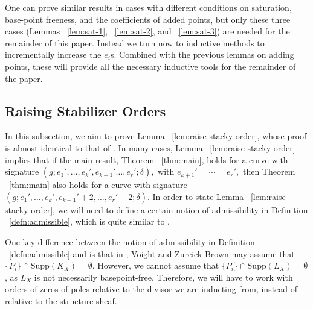 \documentclass{amsart}
\theoremstyle{plain}
\theoremstyle{definition}
\theoremstyle{remark}
\numberwithin{equation}{section}
\newcommand\ssec{\subsection}
\newcommand \Supp{\text{Supp}}
\newcommand \initial{\text{in}}
\begin{document}
%

One can prove similar results in cases with different conditions on saturation, base-point freeness, and the coefficients of added points, but only these three cases (Lemmas ~\ref{lem:sat-1}, ~\ref{lem:sat-2}, and ~\ref{lem:sat-3}) are needed for the remainder of this paper.  Instead we turn now to inductive methods to incrementally increase the $e_i$s.  Combined with the previous lemmas on adding points, these will provide all the necessary inductive tools for the remainder of the paper.

\ssec{Raising Stabilizer Orders}
\label{ssec:raise-orders}
In this subsection, we aim to prove Lemma
~\ref{lem:raise-stacky-order}, whose proof is almost identical to that of \cite[Theorem 8.5.7]{vzb:stacky}. In many cases, Lemma ~\ref{lem:raise-stacky-order} implies that if the main result, Theorem 
~\ref{thm:main}, holds for a curve with signature
$(g;e_1', \ldots, e_k', e_{k+1}' \ldots, e_r';\delta),$ with $e_{k+1}' = \cdots = e_r',$ then Theorem ~\ref{thm:main} also holds for a curve with
signature $(g; e_1', \ldots, e_k',e_{k+1}'+2,\ldots, e_r'+2; \delta).$ In order to state Lemma
~\ref{lem:raise-stacky-order}, we will need to define a certain notion of admissibility in Definition ~\ref{defn:admissible}, which is quite similar to \cite[Definition 8.5.1]{vzb:stacky}.

One key difference between the notion of admissibility in Definition ~\ref{defn:admissible} and \cite[Definition 8.5.1]{vzb:stacky} is that in \cite{vzb:stacky}, Voight and Zureick-Brown may assume that $\{P_i\} \cap \Supp(K_X) = \emptyset.$ However, we cannot assume that $\{P_i\} \cap \Supp(L_X) = \emptyset$, as $L_X$ is not necessarily basepoint-free. Therefore, we will have to work with orders of zeros of poles relative to the divisor we are inducting from, instead of relative to the structure sheaf.
\end{document}
